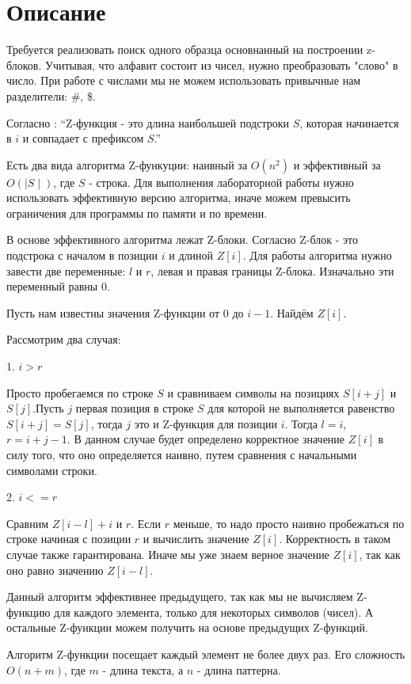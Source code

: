 \section{Описание}

Требуется реализовать поиск одного образца основнанный на построении z-блоков. Учитывая, что алфавит состоит из чисел,
нужно преобразовать "слово" в число. При работе с числами мы не можем использовать привычные нам разделители:
\#, \$.


Согласно \cite{Gasfild}: \enquote{Z-функция - это длина наибольшей подстроки $S$, которая начинается в $i$ и совпадает с префиксом $S$.}

Есть два вида алгоритма Z-функуции: наивный за $O(n^2)$ и эффективный за $O(\mid S \mid)$, где $S$ - строка.
Для выполнения лабораторной работы нужно использовать эффективную версию алгоритма, 
иначе можем превысить ограничения для программы по памяти и по времени.


В основе эффективного алгоритма лежат Z-блоки. Согласно \cite{Gasfild} Z-блок - это подстрока с началом в позиции $i$
и длиной $Z[i]$. Для работы алгоритма нужно завести две переменные: $l$ и $r$, левая и правая границы Z-блока.
Изначально эти переменный равны $0$.


Пусть нам известны значения Z-функции от $0$ до $i-1$. Найдём $Z[i]$. 

Рассмотрим два случая:

1. $i > r$

Просто пробегаемся по строке $S$ и сравниваем символы на позициях $S[i+j]$ и $S[j]$.Пусть $j$ первая позиция 
в строке $S$ для которой не выполняется равенство $S[i + j] = S[j]$, тогда $j$ это и Z-функция для позиции $i$. 
Тогда $l = i$, $r = i + j - 1$. В данном случае будет определено корректное значение $Z[i]$
в силу того, что оно определяется наивно, путем сравнения с начальными символами строки.

2. $i <= r$

Сравним $Z[i-l] + i$ и $r$. Если $r$ меньше, то надо просто наивно пробежаться по строке начиная с 
позиции $r$ и вычислить значение $Z[i]$. Корректность в таком случае также гарантирована. 
Иначе мы уже знаем верное значение $Z[i]$, так как оно равно значению $Z[i-l]$.


Данный алгоритм эффективнее предыдущего, так как мы не вычисляем Z-функцию для каждого элемента, только для некоторых
символов (чисел). А остальные Z-функции можем получить на основе предыдущих Z-функций.

Алгоритм Z-функции посещает каждый элемент не более двух раз. Его сложность $O(n + m)$, где $m$ - длина текста,
а $n$ - длина паттерна.


